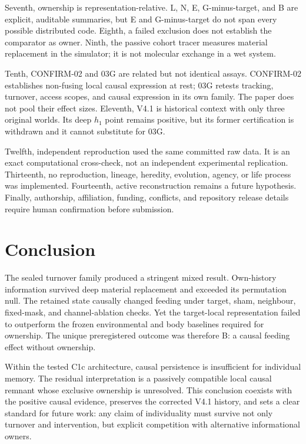 \documentclass[11pt]{article}
\begin{document}
Seventh, ownership is representation-relative. L, N, E, G-minus-target, and B are explicit, auditable summaries, but E and G-minus-target do not span every possible distributed code. Eighth, a failed exclusion does not establish the comparator as owner. Ninth, the passive cohort tracer measures material replacement in the simulator; it is not molecular exchange in a wet system.

Tenth, CONFIRM-02 and 03G are related but not identical assays. CONFIRM-02 establishes non-fusing local causal expression at rest; 03G retests tracking, turnover, access scopes, and causal expression in its own family. The paper does not pool their effect sizes. Eleventh, V4.1 is historical context with only three original worlds. Its deep $h_1$ point remains positive, but its former certification is withdrawn and it cannot substitute for 03G.

Twelfth, independent reproduction used the same committed raw data. It is an exact computational cross-check, not an independent experimental replication. Thirteenth, no reproduction, lineage, heredity, evolution, agency, or life process was implemented. Fourteenth, active reconstruction remains a future hypothesis. Finally, authorship, affiliation, funding, conflicts, and repository release details require human confirmation before submission.

\section{Conclusion}

The sealed turnover family produced a stringent mixed result. Own-history information survived deep material replacement and exceeded its permutation null. The retained state causally changed feeding under target, sham, neighbour, fixed-mask, and channel-ablation checks. Yet the target-local representation failed to outperform the frozen environmental and body baselines required for ownership. The unique preregistered outcome was therefore B: a causal feeding effect without ownership.

Within the tested C1c architecture, causal persistence is insufficient for individual memory. The residual interpretation is a passively compatible local causal remnant whose exclusive ownership is unresolved. This conclusion coexists with the positive causal evidence, preserves the corrected V4.1 history, and sets a clear standard for future work: any claim of individuality must survive not only turnover and intervention, but explicit competition with alternative informational owners.
\end{document}
